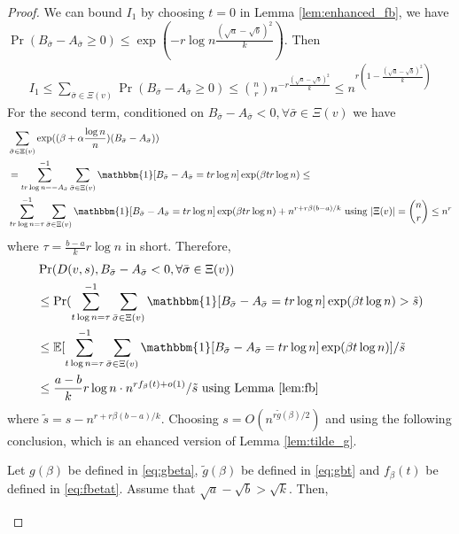 \documentclass{article}
\begin{document}
\begin{proof}
We can bound $I_1$ by choosing $t=0$ in Lemma \ref{lem:enhanced_fb}, we have
$\Pr( B_{\bar{\sigma}} - A_{\bar{\sigma}} \ge 0 ) \leq \exp(-r\log n \frac{(\sqrt{a}-\sqrt{b})^2}{k})$.
Then
\begin{align*}
I_1 \leq \sum_{\bar{\sigma} \in \Xi(v)} \Pr( B_{\bar{\sigma}} - A_{\bar{\sigma}} \geq 0) \leq \binom{n}{r} n^{-r\frac{(\sqrt{a}-\sqrt{b})^2}{k}}
\leq n^{r(1-\frac{(\sqrt{a}-\sqrt{b})^2}{k})}
\end{align*}
For the second term,
conditioned on $B_{\bar{\sigma}} - A_{\bar{\sigma}}    < 0, \forall \bar{\sigma} \in \Xi(v)$ we have
\begin{align*}
&\sum_{\bar{\sigma} \in \Xi(v)} \exp ( (\beta + \alpha \frac{\log n}{n})(B_{\bar{\sigma}} - A_{\bar{\sigma}} ) ) \\
& = \sum_{tr\log n = -A_{\bar{\sigma}} }^{-1} \sum_{\bar{\sigma} \in \Xi(v)} \mathbbm{1}[B_{\bar{\sigma}} - A_{\bar{\sigma}}  = tr \log n] \exp ( \beta  tr\log n)\leq \\ 
&
\sum_{tr\log n =\tau}^{-1} \sum_{\bar{\sigma} \in \Xi(v)}  \mathbbm{1}[B_{\bar{\sigma}} - A_{\bar{\sigma}}  = tr \log n]
\exp ( \beta  tr\log n) + n^{r+r\beta(b-a)/k} \textrm{ using } |\Xi(v)| = \binom{n}{r} \leq n^r
\end{align*}
where $\tau =\frac{b-a}{k}r\log n$ in short. Therefore,
\begin{align*}
&\Pr(D(v,s), B_{\bar{\sigma}} - A_{\bar{\sigma}}  < 0, \forall \bar{\sigma} \in \Xi(v))  \\
&\leq\Pr(\sum_{t\log n =\tau}^{-1}\sum_{\bar{\sigma} \in \Xi(v)} \mathbbm{1}[B_{\bar{\sigma}} - A_{\bar{\sigma}} = tr\log n]\exp ( \beta  t\log n)  > \tilde{s} ) \\
& \leq \mathbb{E}[\sum_{t\log n =\tau}^{-1}\sum_{\bar{\sigma} \in \Xi(v)} \mathbbm{1}[B_{\bar{\sigma}} - A_{\bar{\sigma}} = tr\log n]\exp ( \beta  t\log n)] /  \tilde{s} \\
& \leq \frac{a-b}{k}r\log n \cdot n^{rf_{\beta}(t) + o(1)} / \tilde{s} \textrm{ using Lemma \ref{lem:fb} }
\end{align*}
where $\tilde{s} = s - n^{r+r\beta(b-a)/k}$. 
Choosing $s = O(n^{r\tilde{g}(\beta)/2})$ and using the following conclusion, which is an ehanced version of Lemma
\ref{lem:tilde_g}.
\begin{lemma} \label{lm:ele}
Let $g(\beta)$ be defined in \eqref{eq:gbeta}, $\tilde{g}(\beta)$ be defined in \eqref{eq:gbt} and $f_{\beta}(t)$ be defined in \eqref{eq:fbetat}. Assume that $\sqrt{a}-\sqrt{b}>\sqrt{k}$.
Then,


\end{lemma}
\end{proof}
\end{document}
